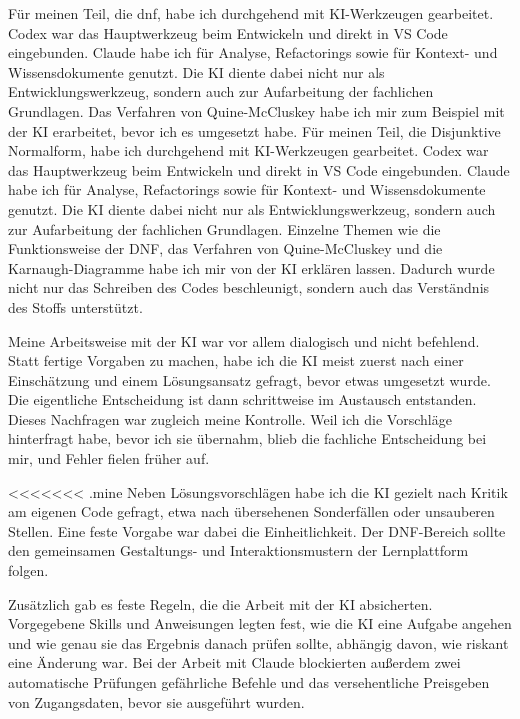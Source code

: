 
Für meinen Teil, die \gls{dnf}, habe ich durchgehend mit KI-Werkzeugen
gearbeitet. Codex war das Hauptwerkzeug beim Entwickeln und direkt in VS Code eingebunden.
Claude habe ich für Analyse, Refactorings sowie für Kontext- und Wissensdokumente genutzt.
Die KI diente dabei nicht nur als Entwicklungswerkzeug, sondern auch zur Aufarbeitung der
fachlichen Grundlagen. Das Verfahren von Quine-McCluskey habe ich mir zum Beispiel mit der
KI erarbeitet, bevor ich es umgesetzt habe.
Für meinen Teil, die Disjunktive Normalform, habe ich durchgehend mit KI-Werkzeugen
gearbeitet. Codex war das Hauptwerkzeug beim Entwickeln und direkt in VS Code eingebunden.
Claude habe ich für Analyse, Refactorings sowie für Kontext- und Wissensdokumente genutzt.
Die KI diente dabei nicht nur als Entwicklungswerkzeug, sondern auch zur Aufarbeitung der
fachlichen Grundlagen. Einzelne
Themen wie die Funktionsweise der DNF, das Verfahren von Quine-McCluskey und die
Karnaugh-Diagramme habe ich mir von der KI erklären lassen. Dadurch wurde nicht nur das
Schreiben des Codes beschleunigt, sondern auch das Verständnis des Stoffs unterstützt.


Meine Arbeitsweise mit der KI war vor allem dialogisch und nicht befehlend. Statt fertige
Vorgaben zu machen, habe ich die KI meist zuerst nach einer Einschätzung und einem
Lösungsansatz gefragt, bevor etwas umgesetzt wurde. Die eigentliche Entscheidung ist dann
schrittweise im Austausch entstanden. Dieses Nachfragen war zugleich meine Kontrolle. Weil
ich die Vorschläge hinterfragt habe, bevor ich sie übernahm, blieb die fachliche
Entscheidung bei mir, und Fehler fielen früher auf.

<<<<<<< .mine
Neben Lösungsvorschlägen habe ich die KI gezielt nach Kritik am eigenen Code gefragt, etwa
nach übersehenen Sonderfällen oder unsauberen Stellen. Eine feste Vorgabe
war dabei die Einheitlichkeit. Der DNF-Bereich sollte den gemeinsamen Gestaltungs- und
Interaktionsmustern der Lernplattform folgen.

Zusätzlich gab es feste Regeln, die die Arbeit mit der KI absicherten. Vorgegebene Skills
und Anweisungen legten fest, wie die KI eine Aufgabe angehen und wie genau sie das Ergebnis
danach prüfen sollte, abhängig davon, wie riskant eine Änderung war. Bei der Arbeit mit
Claude blockierten außerdem zwei automatische Prüfungen gefährliche Befehle und das
versehentliche Preisgeben von Zugangsdaten, bevor sie ausgeführt wurden.

